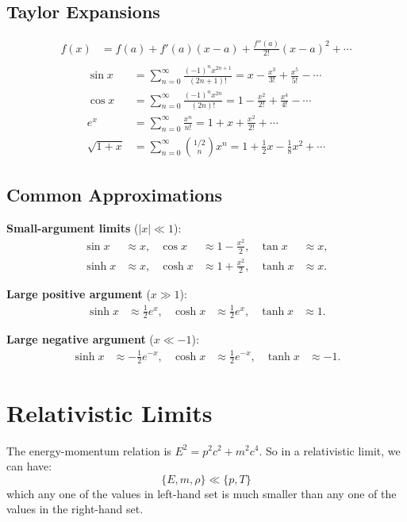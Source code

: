 \clearpage
\subsection*{Taylor Expansions}
\begin{align*}
      f(x) &= f(a) + f'(a)(x-a) + \tfrac{f''(a)}{2!}(x-a)^2 + \cdots\\
\end{align*}
\begin{align*}
      \sin x &= \sum_{n=0}^\infty \frac{(-1)^n x^{2n+1}}{(2n+1)!} = x - \tfrac{x^3}{3!} + \tfrac{x^5}{5!} - \cdots\\
      \cos x &= \sum_{n=0}^\infty \frac{(-1)^n x^{2n}}{(2n)!} = 1 - \tfrac{x^2}{2!} + \tfrac{x^4}{4!} - \cdots \\
      e^x &= \sum_{n=0}^\infty \frac{x^n}{n!} = 1 + x + \tfrac{x^2}{2!} + \cdots \\
      \sqrt{1+x} &= \sum_{n=0}^\infty \binom{1/2}{n} x^n = 1 + \tfrac{1}{2}x - \tfrac{1}{8}x^2 + \cdots
\end{align*}

\subsection*{Common Approximations}
\textbf{Small-argument limits} ($|x|\ll 1$):
\begin{align*}
      \sin x &\approx x, &
      \cos x &\approx 1 - \frac{x^2}{2}, &
      \tan x &\approx x,\\
      \sinh x &\approx x, &
      \cosh x &\approx 1 + \frac{x^2}{2}, &
      \tanh x &\approx x.
\end{align*}

\textbf{Large positive argument} ($x\gg 1$):
\begin{align*}
      \sinh x &\approx \frac{1}{2}e^x, &
      \cosh x &\approx \frac{1}{2}e^x, &
      \tanh x &\approx 1.
\end{align*}

\textbf{Large negative argument} ($x\ll -1$):
\begin{align*}
      \sinh x &\approx -\frac{1}{2}e^{-x}, &
      \cosh x &\approx \frac{1}{2}e^{-x}, &
      \tanh x &\approx -1.
\end{align*}

\clearpage

\bigskip\noindent
\section{Relativistic Limits}
The energy-momentum relation is $E^2 = p^2c^2 + m^2c^4$.
So in a relativistic limit, we can have:
\[
      \{ E, m, \rho\} \ll \{p, T\}
\]
which any one of the values in left-hand set is much smaller than any one of the values in the right-hand set.


